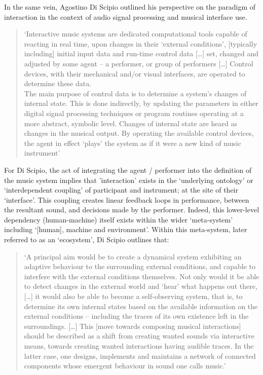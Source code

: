In the same vein, Agostino Di Scipio outlined his perspective on the paradigm of interaction in the context of audio signal processing and musical interface use. 
\begin{quote}
    `Interactive music systems are dedicated computational tools capable of reacting in real time, upon changes in their `external conditions', [typically including] initial input data and run-time control data […] set, changed and adjusted by some agent – a performer, or group of performers […] Control devices, with their mechanical and/or visual interfaces, are operated to determine these data.\\ 

    The main purpose of control data is to determine a system's changes of internal state. This is done indirectly, by updating the parameters in either digital signal processing techniques or program routines operating at a more abstract, symbolic level. Changes of internal state are heard as changes in the musical output. By operating the available control devices, the agent in effect `plays' the system as if it were a new kind of music instrument' \citeyearpar[p. 1]{discipio2003}
\end{quote}
For Di Scipio, the act of integrating the agent / performer into the definition of the music system implies that 'interaction' exists in the `underlying ontology' or `interdependent coupling' of participant and instrument; at the site of their `interface'. This coupling creates linear feedback loops in performance, between the resultant sound, and decisions made by the performer. Indeed, this lower-level dependency (human-machine) itself exists within the wider `meta-system' including `[human], machine and environment'. Within this meta-system, later referred to as an `ecosystem', Di Scipio outlines that:
\begin{quote}
    `A principal aim would be to create a dynamical system exhibiting an adaptive behaviour to the surrounding external conditions, and capable to interfere with the external conditions themselves. Not only would it be able to detect changes in the external world and `hear' what happens out there, […] it would also be able to become a self-observing system, that is, to determine its own internal states based on the available information on the external conditions – including the traces of its own existence left in the surroundings. […] This [move towards composing musical interactions] should be described as a shift from creating wanted sounds via interactive means, towards creating wanted interactions having audible traces. In the latter case, one designs, implements and maintains a network of connected components whose emergent behaviour in sound one calls music.' \citeyearpar[p. 6]{discipio2003}
\end{quote}

